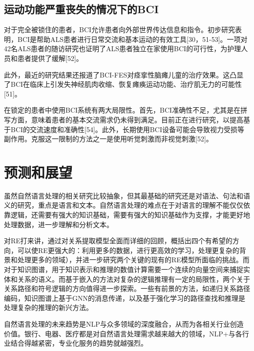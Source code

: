 \documentclass[UTF8,a4paper]{ctexart}
\begin{document}
\subsection{运动功能严重丧失的情况下的BCI}
对于完全被锁住的患者，BCI允许患者向外部世界传达信息和指令。初步研究表明，BCI是帮助ALS患者进行日常交流和基本运动的有效工具[30，51-53]。一项对42名ALS患者的随访研究也证明了ALS患者独立在家使用BCI的可行性，为护理人员和患者提供了缓解[52]。
\par 
此外，最近的研究结果还报道了BCI-FES对痉挛性脑瘫儿童的治疗效果。这凸显了BCI在临床上引发失神经肌肉收缩、恢复瘫痪运动功能、治疗肌无力的可能性[51]。
\par
在锁定的患者中使用BCI系统有两大局限性。首先，BCI准确性不足，尤其是在拼写方面，意味着患者的基本交流需求仍未得到满足。目前正在进行研究，以提高基于BCI的交流速度和准确性[54]。此外，长期使用BCI设备可能会导致视力受损等副作用。克服这一限制的方法之一是使用听觉刺激而非视觉刺激[52]。

\section{预测和展望}
虽然自然语言处理的相关研究比较抽象，但其最基础的研究还是对语法、句法和语义的研究，重点是语言和文本。自然语言处理的难点在于对语言的理解不能仅仅依靠逻辑，还需要有强大的知识基础，需要有强大的知识基础作为支撑，才能更好地处理数据，进一步理解和分析文本。
\par 
对RE打来讲，通过对关系提取模型全面而详细的回顾，概括出四个有希望的方向，可以使RE更强大的：利用更多的数据，进行更高效的学习，处理更复杂的背景和处理更多的领域），并进一步研究两个关键的现有的RE模型所面临的挑战。而对于知识图谱，用于知识表示和推理的数值计算需要一个连续的向量空间来捕捉实体和关系的语义。而基于嵌入的方法对复杂的逻辑推理有一定的局限性，两个关于关系路径和符号逻辑的方向值得进一步探索。一些有前景的方法，如递归关系路径编码，知识图谱上基于GNN的消息传递，以及基于强化学习的路径查找和推理是处理复杂的推理的新兴方法。
\par 
自然语言处理的未来趋势是NLP与众多领域的深度融合，从而为各相关行业创造价值。银行、电器、医疗都是对自然语言处理需求越来越大的领域，NLP+与各行业结合得越紧密，专业化服务的趋势就越强烈。

\renewcommand{\refname}{参考文献}


\clearpage
\end{document}
